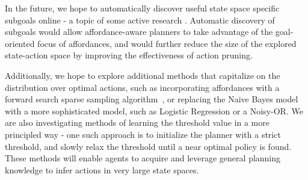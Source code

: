 \documentclass[letterpaper]{article}
\begin{document}
In the future, we hope to automatically discover useful state space
specific subgoals online - a topic of some active research
\cite{Mcgovern01automaticdiscovery,Simsek:2005:IUS:1102351.1102454}.
Automatic discovery of subgoals would allow affordance-aware planners
to take advantage of the goal-oriented focus of affordances, and would
further reduce the size of the explored state-action space by
improving the effectiveness of action pruning.

Additionally, we hope to explore additional methods that capitalize on
the distribution over optimal actions, such as incorporating
affordances with a forward search sparse sampling
algorithm~\cite{walsh2010integrating}, or replacing the Naive Bayes
model with a more sophisticated model, such as Logistic Regression or
a Noisy-OR.  We are also investigating methods of learning the
threshold value in a more principled way - one such approach is to
initialize the planner with a strict threshold, and slowly relax the
threshold until a near optimal policy is found.  These methods will
enable agents to acquire and leverage general planning knowledge to
infer actions in very large state spaces.

{\small


}
\end{document}
